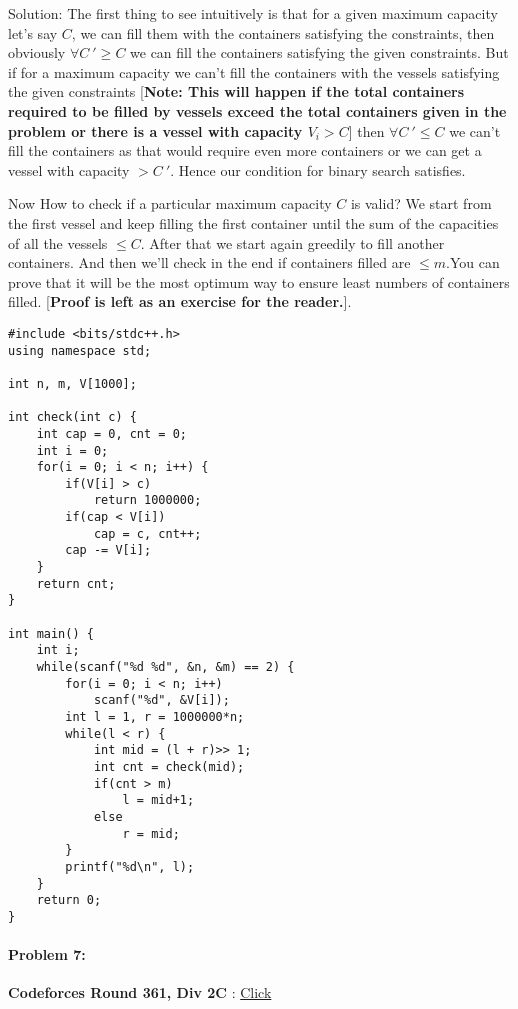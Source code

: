 \documentclass[12pt]{article}
\begin{document}
\begin{large}
Solution: The first thing to see intuitively is that for a given maximum capacity let's say $C$, we can fill them with the containers satisfying the constraints, then obviously $\forall C\ ' \geq C$ we can fill the containers satisfying the given constraints. But if for a maximum capacity we can't fill the containers with the vessels satisfying the given constraints [\textbf{Note: This will happen if the total containers required to be filled by vessels exceed the total containers given in the problem or there is a vessel with capacity $V_i > C$}] then $\forall C\ '\leq C$ we can't fill the containers as that would require even more containers or we can get a vessel with capacity $>C\ '$. Hence our condition for binary search satisfies.

Now How to check if a particular maximum capacity $C$ is valid? We start from the first vessel and keep filling the first container until the sum of the capacities of all the vessels $ \leq C$. After that we start again greedily to fill another containers. And then we'll check in the end if containers filled are $\leq m$.You can prove that it will be the most optimum way to ensure least numbers of containers filled. [\textbf{Proof is left as an exercise for the reader.}].

\begin{verbatim}
#include <bits/stdc++.h>
using namespace std; 

int n, m, V[1000];

int check(int c) {
    int cap = 0, cnt = 0;
    int i = 0;
    for(i = 0; i < n; i++) {
        if(V[i] > c)
            return 1000000;
        if(cap < V[i])
            cap = c, cnt++;
        cap -= V[i];
    }
    return cnt;
}

int main() {
    int i;
    while(scanf("%d %d", &n, &m) == 2) {
        for(i = 0; i < n; i++)
            scanf("%d", &V[i]);
        int l = 1, r = 1000000*n; 
        while(l < r) {
            int mid = (l + r)>> 1;
            int cnt = check(mid);
            if(cnt > m)
                l = mid+1;
            else
                r = mid;
        }
        printf("%d\n", l);
    }
    return 0;
}
\end{verbatim}   

\paragraph{\large Problem 7:} \textbf{Codeforces Round 361, Div 2C} : \href{http://codeforces.com/contest/689/problem/C}{Click}


\end{large}
\end{document}
